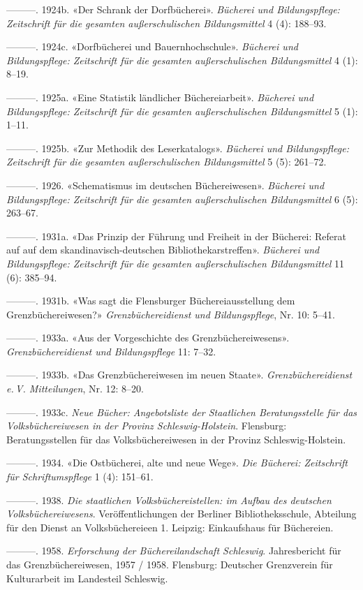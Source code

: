 \documentclass[a4paper,
fontsize=11pt,
oneside,
numbers=noperiodatend,
parskip=half-,
bibliography=totoc,
final
]{scrartcl}
\begin{document}
---------. 1924b. «Der Schrank der Dorfbücherei». \emph{Bücherei und
Bildungspflege: Zeitschrift für die gesamten außerschulischen
Bildungsmittel} 4 (4): 188--93.

---------. 1924c. «Dorfbücherei und Bauernhochschule». \emph{Bücherei
und Bildungspflege: Zeitschrift für die gesamten außerschulischen
Bildungsmittel} 4 (1): 8--19.

---------. 1925a. «Eine Statistik ländlicher Büchereiarbeit».
\emph{Bücherei und Bildungspflege: Zeitschrift für die gesamten
außerschulischen Bildungsmittel} 5 (1): 1--11.

---------. 1925b. «Zur Methodik des Leserkatalogs». \emph{Bücherei und
Bildungspflege: Zeitschrift für die gesamten außerschulischen
Bildungsmittel} 5 (5): 261--72.

---------. 1926. «Schematismus im deutschen Büchereiwesen».
\emph{Bücherei und Bildungspflege: Zeitschrift für die gesamten
außerschulischen Bildungsmittel} 6 (5): 263--67.

---------. 1931a. «Das Prinzip der Führung und Freiheit in der Bücherei:
Referat auf auf dem skandinavisch-deutschen Bibliothekarstreffen».
\emph{Bücherei und Bildungspflege: Zeitschrift für die gesamten
außerschulischen Bildungsmittel} 11 (6): 385--94.

---------. 1931b. «Was sagt die Flensburger Büchereiausstellung dem
Grenzbüchereiwesen?» \emph{Grenzbüchereidienst und Bildungspflege}, Nr.
10: 5--41.

---------. 1933a. «Aus der Vorgeschichte des Grenzbüchereiwesens».
\emph{Grenzbüchereidienst und Bildungspflege} 11: 7--32.

---------. 1933b. «Das Grenzbüchereiwesen im neuen Staate».
\emph{Grenzbüchereidienst e.\,V. Mitteilungen}, Nr. 12: 8--20.

---------. 1933c. \emph{Neue Bücher: Angebotsliste der Staatlichen
Beratungsstelle für das Volksbüchereiwesen in der Provinz
Schleswig-Holstein}. Flensburg: Beratungsstellen für das
Volksbüchereiwesen in der Provinz Schleswig-Holstein.

---------. 1934. «Die Ostbücherei, alte und neue Wege». \emph{Die
Bücherei: Zeitschrift für Schriftumspflege} 1 (4): 151--61.

---------. 1938. \emph{Die staatlichen Volksbüchereistellen: im Aufbau
des deutschen Volksbüchereiwesens}. Veröffentlichungen der Berliner
Bibliotheksschule, Abteilung für den Dienst an Volksbüchereieen 1.
Leipzig: Einkaufshaus für Büchereien.

---------. 1958. \emph{Erforschung der Büchereilandschaft Schleswig}.
Jahresbericht für das Grenzbüchereiwesen, 1957 / 1958. Flensburg:
Deutscher Grenzverein für Kulturarbeit im Landesteil Schleswig.
\end{document}
